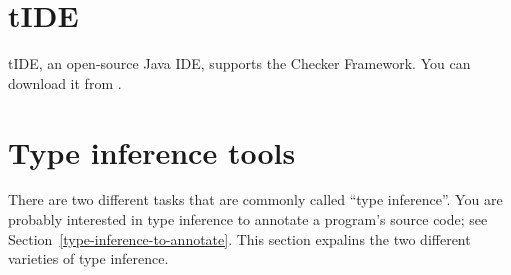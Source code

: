 \section{tIDE\label{tide}}

\begin{sloppypar}
tIDE, an open-source Java IDE, supports the Checker Framework.
You can download it from .
\end{sloppypar}


\section{Type inference tools\label{type-inference-varieties}}

There are two different tasks that are commonly called ``type inference''.
You are probably interested in type inference to annotate a program's
source code; see Section~\ref{type-inference-to-annotate}.  This section
expalins the two different varieties of type inference.

